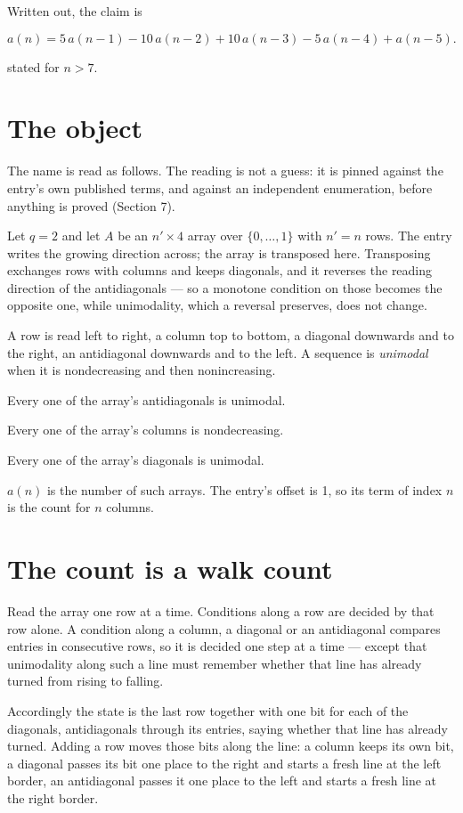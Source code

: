 \documentclass[11pt]{article}
\theoremstyle{definition}
\begin{document}
Written out, the claim is

\[a(n) = 5\,a(n-1) - 10\,a(n-2) + 10\,a(n-3) - 5\,a(n-4) + a(n-5).\]

stated for $n > 7$.

\section{The object}

The name is read as follows. The reading is not a guess: it is pinned against the entry's own published terms, and against an independent enumeration, before anything is proved (Section 7).

Let $q = 2$ and let $A$ be an $n' \times 4$ array over $\{0,\dots,1\}$ with $n' = n$ rows. The entry writes the growing direction across; the array is transposed here. Transposing exchanges rows with columns and keeps diagonals, and it reverses the reading direction of the antidiagonals --- so a monotone condition on those becomes the opposite one, while unimodality, which a reversal preserves, does not change.

A row is read left to right, a column top to bottom, a diagonal downwards and to the right, an antidiagonal downwards and to the left. A sequence is {\itshape unimodal} when it is nondecreasing and then nonincreasing.

Every one of the array's antidiagonals is unimodal.

Every one of the array's columns is nondecreasing.

Every one of the array's diagonals is unimodal.

$a(n)$ is the number of such arrays. The entry's offset is 1, so its term of index $n$ is the count for $n$ columns.

\section{The count is a walk count}

Read the array one row at a time. Conditions along a row are decided by that row alone. A condition along a column, a diagonal or an antidiagonal compares entries in consecutive rows, so it is decided one step at a time --- except that unimodality along such a line must remember whether that line has already turned from rising to falling.

Accordingly the state is the last row together with one bit for each of the diagonals, antidiagonals through its entries, saying whether that line has already turned. Adding a row moves those bits along the line: a column keeps its own bit, a diagonal passes its bit one place to the right and starts a fresh line at the left border, an antidiagonal passes it one place to the left and starts a fresh line at the right border.
\end{document}
